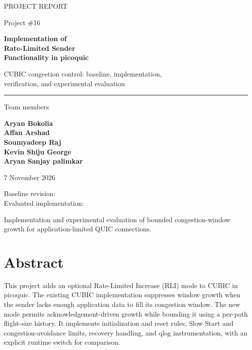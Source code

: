 \documentclass[11pt,a4paper]{article}
\begin{document}
\hypersetup{pageanchor=false}
\begin{titlepage}
\centering
\vspace*{10mm}
{\Large\color{accent} PROJECT REPORT}\par
\vspace{7mm}
{\large Project \#16}\par
\vspace{10mm}
{\Huge\bfseries Implementation of\\[3mm] Rate-Limited Sender\\[3mm] Functionality in picoquic}\par
\vspace{8mm}
{\Large CUBIC congestion control: baseline, implementation,\\ verification, and experimental evaluation}\par
\vspace{10mm}
\rule{0.8\textwidth}{0.7pt}\par
\vspace{7mm}
{\large Team members}\par
\vspace{3mm}
{\Large\bfseries Aryan Bokolia\\[2mm]
Affan Arshad\\[2mm]
Soumyadeep Raj\\[2mm]
Kevin Shiju George\\[2mm]
Aryan Sanjay palimkar}\par
\vspace{7mm}
{\large 7 November 2026}\par
\vspace{6mm}
{\normalsize Baseline revision: \texttt{\BaselineCommit}\\
Evaluated implementation: \texttt{\ImplementationCommit}}\par
\vfill
\begin{minipage}{0.85\textwidth}
\small Implementation and experimental evaluation of bounded congestion-window
growth for application-limited QUIC connections.
\end{minipage}
\end{titlepage}
\hypersetup{pageanchor=true}

\section*{Abstract}
This project adds an optional Rate-Limited Increase (RLI) mode to CUBIC in
picoquic. The existing CUBIC implementation suppresses window growth when
the sender lacks enough application data to fill its congestion window. The
new mode permits acknowledgement-driven growth while bounding it using a
per-path flight-size history. It implements initialization and reset rules,
Slow Start and congestion-avoidance limits, recovery handling, and qlog
instrumentation, with an explicit runtime switch for comparison.
\end{document}
